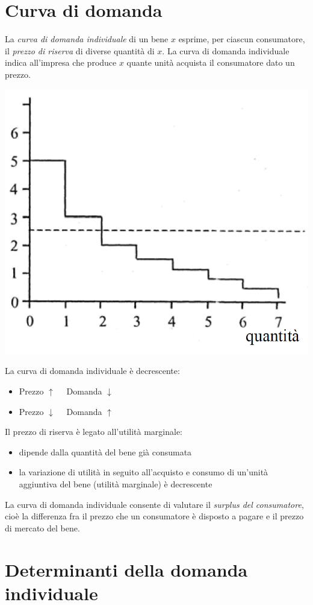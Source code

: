 \section{Curva di domanda}
La \emph{curva di domanda individuale} di un bene $x$ esprime, per ciascun consumatore, il \emph{prezzo di riserva} di
diverse quantità di $x$. La curva di domanda individuale indica
all’impresa che produce $x$ quante unità
acquista il consumatore dato un prezzo.
\begin{center}
	\includegraphics[width=0.3\linewidth]{images/curva_di_domanda}
\end{center}

La curva di domanda individuale è decrescente:
\begin{itemize}
	\item Prezzo $\uparrow \quad$ Domanda $\downarrow$
	\item Prezzo $\downarrow \quad$ Domanda $\uparrow$
\end{itemize}

Il prezzo di riserva è legato all’utilità marginale:
\begin{itemize}
	\item dipende dalla quantità del bene già consumata
	\item la variazione di utilità in seguito all’acquisto e consumo di un’unità aggiuntiva del bene (utilità
	marginale) è decrescente
\end{itemize}

La curva di domanda individuale consente di valutare il \emph{surplus del consumatore}, cioè la differenza fra il
prezzo che un consumatore è disposto a pagare e il prezzo di mercato del bene.

\section{Determinanti della domanda individuale}
